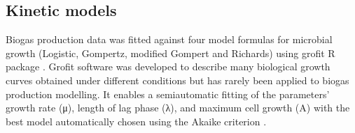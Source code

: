 \subsection{Kinetic models}
Biogas production data was fitted against four model formulas for microbial growth (Logistic, Gompertz, modified Gompert and Richards) using grofit R package \cite{Kahm_2010}. Grofit software was developed to describe many biological growth curves obtained under different conditions but has rarely been applied to biogas production modelling. It enables a semiautomatic fitting of the parameters’ growth rate (μ), length of lag phase (λ), and maximum cell growth (A) with the best model automatically chosen using the Akaike criterion \cite{Hasenbrink_2006}.